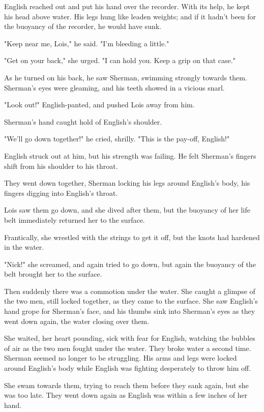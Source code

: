 \documentclass{novel}
\begin{document}
English reached out and put his hand over the recorder. With its help, he kept his head above water. His legs hung like leaden weights; and if it hadn't been for the buoyancy of the recorder, he would have sunk.

"Keep near me, Lois," he said. "I'm bleeding a little."

"Get on your back," she urged. "I can hold you. Keep a grip on that case."

As he turned on his back, he saw Sherman, swimming strongly towards them. Sherman's eyes were gleaming, and his teeth showed in a vicious snarl.

"Look out!" English-panted, and pushed Lois away from him.

Sherman's hand caught hold of English's shoulder.

"We'll go down together!" he cried, shrilly. "This is the pay-off, English!"

English struck out at him, but his strength was failing. He felt Sherman's fingers shift from his shoulder to his throat.

They went down together, Sherman locking his legs around English's body, his fingers digging into English's throat.

Lois saw them go down, and she dived after them, but the buoyancy of her life belt immediately returned her to the surface.

Frantically, she wrestled with the strings to get it off, but the knots had hardened in the water.

"Nick!" she screamed, and again tried to go down, but again the buoyancy of the belt brought her to the surface.

Then suddenly there was a commotion under the water. She caught a glimpse of the two men, still locked together, as they came to the surface. She saw English's hand grope for Sherman's face, and his thumbs sink into Sherman's eyes as they went down again, the water closing over them.

She waited, her heart pounding, sick with fear for English, watching the bubbles of air as the two men fought under the water. They broke water a second time. Sherman seemed no longer to be struggling. His arms and legs were locked around English's body while English was fighting desperately to throw him off.

She swam towards them, trying to reach them before they sank again, but she was too late. They went down again as English was within a few inches of her hand.
\end{document}
